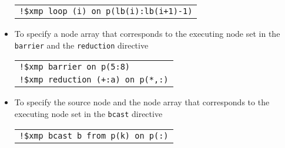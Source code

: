 \begin{itemize}

\begin{tabular}{l}
\verb|!$xmp loop (i) on p(lb(i):lb(i+1)-1)| \\
\end{tabular}%

\item To specify a node array that corresponds to the executing node set
      in the {\tt barrier} and the {\tt reduction} directive


\begin{tabular}{l}
\verb|!$xmp barrier on p(5:8)| \\
\verb|!$xmp reduction (+:a) on p(*,:)| \\
\end{tabular}

\item To specify the source node and the node array that corresponds to
      the executing node set in the {\tt bcast} directive 


\begin{tabular}{l}
\verb|!$xmp bcast b from p(k) on p(:)| \\
\end{tabular}
\end{itemize}

%


